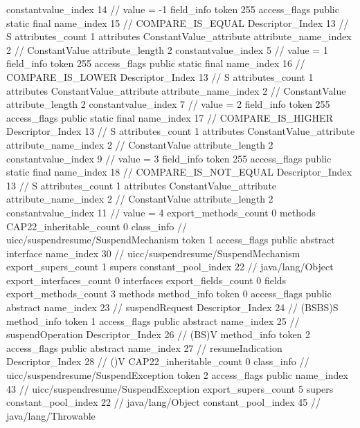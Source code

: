 {{{{{{{					constantvalue_index	14		// value = -1
				}
				}
			}
			field_info {
				token	255
				access_flags	public static final
				name_index	15		// COMPARE_IS_EQUAL
				Descriptor_Index	13		// S
				attributes_count	1
				attributes {
				ConstantValue_attribute {
					attribute_name_index	2		// ConstantValue
					attribute_length	2
					constantvalue_index	5		// value = 1
				}
				}
			}
			field_info {
				token	255
				access_flags	public static final
				name_index	16		// COMPARE_IS_LOWER
				Descriptor_Index	13		// S
				attributes_count	1
				attributes {
				ConstantValue_attribute {
					attribute_name_index	2		// ConstantValue
					attribute_length	2
					constantvalue_index	7		// value = 2
				}
				}
			}
			field_info {
				token	255
				access_flags	public static final
				name_index	17		// COMPARE_IS_HIGHER
				Descriptor_Index	13		// S
				attributes_count	1
				attributes {
				ConstantValue_attribute {
					attribute_name_index	2		// ConstantValue
					attribute_length	2
					constantvalue_index	9		// value = 3
				}
				}
			}
			field_info {
				token	255
				access_flags	public static final
				name_index	18		// COMPARE_IS_NOT_EQUAL
				Descriptor_Index	13		// S
				attributes_count	1
				attributes {
				ConstantValue_attribute {
					attribute_name_index	2		// ConstantValue
					attribute_length	2
					constantvalue_index	11		// value = 4
				}
				}
			}
			}
			export_methods_count	0
			methods {
			}
			CAP22_inheritable_count	0
		}
		class_info {		// uicc/suspendresume/SuspendMechanism
			token	1
			access_flags	public abstract interface
			name_index	30		// uicc/suspendresume/SuspendMechanism
			export_supers_count	1
			supers {
				constant_pool_index	22		// java/lang/Object
			}
			export_interfaces_count	0
			interfaces {
			}
			export_fields_count	0
			fields {
			}
			export_methods_count	3
			methods {
				method_info {
					token	0
					access_flags	public abstract
					name_index	23		// suspendRequest
					Descriptor_Index	24		// (BSBS)S
				}
				method_info {
					token	1
					access_flags	public abstract
					name_index	25		// suspendOperation
					Descriptor_Index	26		// (BS)V
				}
				method_info {
					token	2
					access_flags	public abstract
					name_index	27		// resumeIndication
					Descriptor_Index	28		// ()V
				}
			}
			CAP22_inheritable_count	0
		}
		class_info {		// uicc/suspendresume/SuspendException
			token	2
			access_flags	public
			name_index	43		// uicc/suspendresume/SuspendException
			export_supers_count	5
			supers {
				constant_pool_index	22		// java/lang/Object
				constant_pool_index	45		// java/lang/Throwable
}}}}
